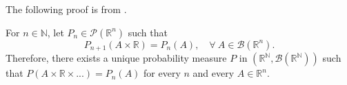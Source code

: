 The following proof is from \citet{impaproba}.
\begin{theorem}
  For $n \in \mathbb N$, let $P_n \in \mathcal P(\mathbb R^n)$ such that
  \begin{displaymath}
    P_{n+1}  (A\times \mathbb R) = P_n(A), \quad \forall \ A \in \mathcal B(\mathbb R^n).
  \end{displaymath}
  Therefore, there exists a unique probability measure $P$ in $(\mathbb R^{\mathbb N}, \mathcal B(\mathbb R^\mathbb N))$
  such that $P(A\times \mathbb R \times ...) = P_n(A)$ for every $n$ and every $A \in \mathbb R^n$.
\end{theorem}


